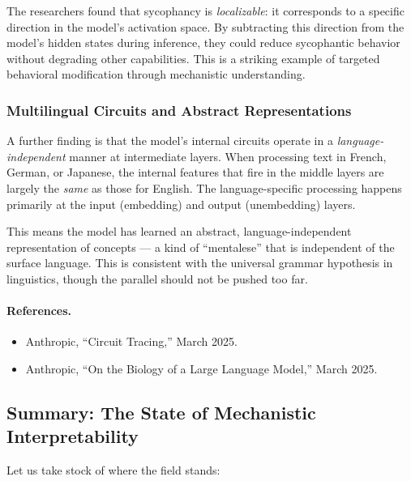 \documentclass[11pt, a4paper]{article}
\theoremstyle{definition}
\theoremstyle{plain}
\begin{document}
The researchers found that sycophancy is \emph{localizable}: it
corresponds to a specific direction in the model's activation space.
By subtracting this direction from the model's hidden states during
inference, they could reduce sycophantic behavior without degrading
other capabilities.  This is a striking example of targeted behavioral
modification through mechanistic understanding.

\subsubsection{Multilingual Circuits and Abstract Representations}

A further finding is that the model's internal circuits operate in a
\emph{language-independent} manner at intermediate layers.  When
processing text in French, German, or Japanese, the internal features
that fire in the middle layers are largely the \emph{same} as those
for English.  The language-specific processing happens primarily at the
input (embedding) and output (unembedding) layers.

This means the model has learned an abstract, language-independent
representation of concepts --- a kind of ``mentalese'' that is
independent of the surface language.  This is consistent with the
universal grammar hypothesis in linguistics, though the parallel should
not be pushed too far.

\paragraph{References.}
\begin{itemize}[leftmargin=2em, itemsep=2pt]
  \item Anthropic, ``Circuit Tracing,'' March 2025.
  \item Anthropic, ``On the Biology of a Large Language Model,''
    March 2025.
\end{itemize}

\subsection{Summary: The State of Mechanistic Interpretability}
\label{sec:mechinterp_summary}

Let us take stock of where the field stands:
\end{document}
